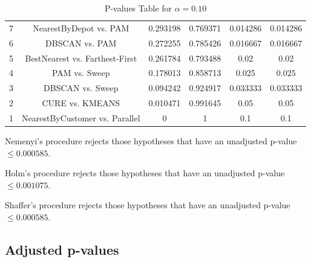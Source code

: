 \documentclass[a4paper,10pt]{article}
\begin{document}
\begin{landscape}
\begin{table}[!htp]
\begin{tabular}{cccccc}
7&NearestByDepot vs. PAM&0.293198&0.769371&0.014286&0.014286\\
6&DBSCAN vs. PAM&0.272255&0.785426&0.016667&0.016667\\
5&BestNearest vs. Farthest-First&0.261784&0.793488&0.02&0.02\\
4&PAM vs. Sweep&0.178013&0.858713&0.025&0.025\\
3&DBSCAN vs. Sweep&0.094242&0.924917&0.033333&0.033333\\
2&CURE vs. KMEANS&0.010471&0.991645&0.05&0.05\\
1&NearestByCustomer vs. Parallel&0&1&0.1&0.1\\
\hline
\end{tabular}
\caption{P-values Table for $\alpha=0.10$}
\end{table}Nemenyi's procedure rejects those hypotheses that have an unadjusted p-value $\le0.000585$.

Holm's procedure rejects those hypotheses that have an unadjusted p-value $\le0.001075$.

Shaffer's procedure rejects those hypotheses that have an unadjusted p-value $\le0.000585$.

\pagebreak

\subsection{Adjusted p-values}


\end{landscape}
\end{document}
